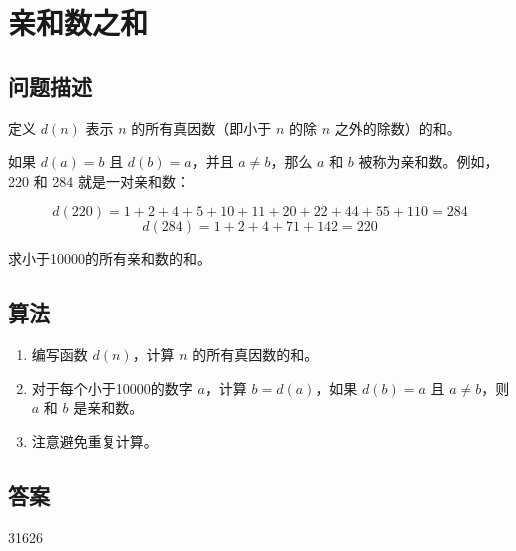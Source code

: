 \section{亲和数之和}\label{sec:problem21}
\subsection{问题描述}
\begin{tcolorbox}
	定义 $d(n)$ 表示 $n$ 的所有真因数（即小于 $n$ 的除 $n$ 之外的除数）的和。

	如果 $d(a) = b$ 且 $d(b) = a$，并且 $a \neq b$，那么 $a$ 和 $b$ 被称为亲和数。例如，220 和 284 就是一对亲和数：

	\[
		d(220) = 1 + 2 + 4 + 5 + 10 + 11 + 20 + 22 + 44 + 55 + 110 = 284
	\]
	\[
		d(284) = 1 + 2 + 4 + 71 + 142 = 220
	\]

	求小于10000的所有亲和数的和。
\end{tcolorbox}

\subsection{算法}
\begin{enumerate}
	\item 编写函数 $d(n)$，计算 $n$ 的所有真因数的和。
	\item 对于每个小于10000的数字 $a$，计算 $b = d(a)$，如果 $d(b) = a$ 且 $a \neq b$，则 $a$ 和 $b$ 是亲和数。
	\item 注意避免重复计算。
\end{enumerate}

\subsection{答案}
31626
